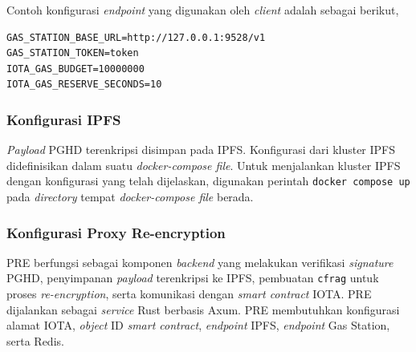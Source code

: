 Contoh konfigurasi \textit{endpoint} yang digunakan oleh \textit{client} adalah sebagai berikut,

\begin{lstlisting}[caption={Konfigurasi \textit{Endpoint} IOTA Gas Station}, label={lst:konfigurasi-gas-station}, float=htb]
GAS_STATION_BASE_URL=http://127.0.0.1:9528/v1
GAS_STATION_TOKEN=token
IOTA_GAS_BUDGET=10000000
IOTA_GAS_RESERVE_SECONDS=10
\end{lstlisting}


\subsubsection{Konfigurasi IPFS}

\textit{Payload} PGHD terenkripsi disimpan pada IPFS\@. 
Konfigurasi dari kluster IPFS didefinisikan dalam suatu \textit{docker-compose file}. 
Untuk menjalankan kluster IPFS dengan konfigurasi yang telah dijelaskan, digunakan perintah \texttt{docker compose up} pada \textit{directory} tempat \textit{docker-compose file} berada.



\subsubsection{Konfigurasi Proxy Re-encryption}

PRE berfungsi sebagai komponen \textit{backend} yang melakukan verifikasi \textit{signature} PGHD, penyimpanan \textit{payload} terenkripsi ke IPFS, pembuatan \texttt{cfrag} untuk proses \textit{re-encryption}, serta komunikasi dengan \textit{smart contract} IOTA\@. 
PRE dijalankan sebagai \textit{service} Rust berbasis Axum. 
PRE membutuhkan konfigurasi alamat IOTA, \textit{object} ID \textit{smart contract}, \textit{endpoint} IPFS, \textit{endpoint} Gas Station, serta Redis.

